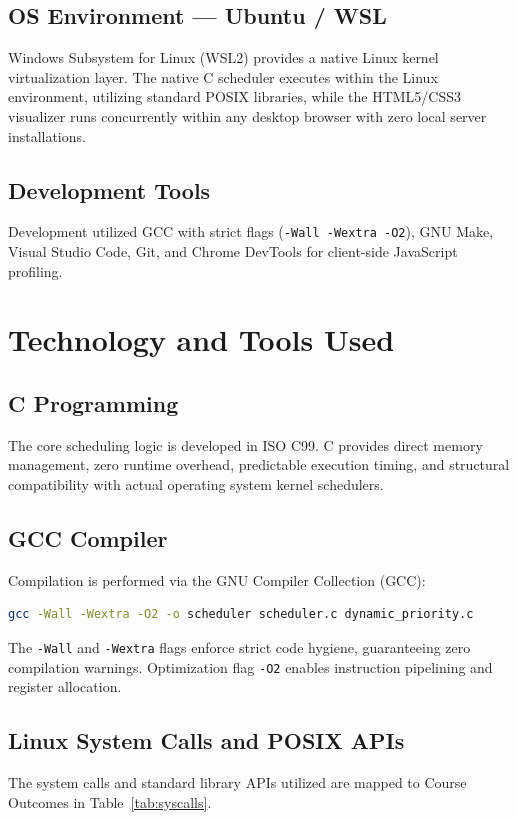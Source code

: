 \documentclass[12pt,a4paper]{report}
\begin{document}
\section{OS Environment --- Ubuntu / WSL}
Windows Subsystem for Linux (WSL2) provides a native Linux kernel virtualization layer. The native C scheduler executes within the Linux environment, utilizing standard POSIX libraries, while the HTML5/CSS3 visualizer runs concurrently within any desktop browser with zero local server installations.

\section{Development Tools}
Development utilized GCC with strict flags (\texttt{-Wall -Wextra -O2}), GNU Make, Visual Studio Code, Git, and Chrome DevTools for client-side JavaScript profiling.

\chapter{Technology and Tools Used}\label{ch4}

\section{C Programming}
The core scheduling logic is developed in ISO C99. C provides direct memory management, zero runtime overhead, predictable execution timing, and structural compatibility with actual operating system kernel schedulers.

\section{GCC Compiler}
Compilation is performed via the GNU Compiler Collection (GCC):
\begin{lstlisting}[language=bash]
gcc -Wall -Wextra -O2 -o scheduler scheduler.c dynamic_priority.c
\end{lstlisting}
The \texttt{-Wall} and \texttt{-Wextra} flags enforce strict code hygiene, guaranteeing zero compilation warnings. Optimization flag \texttt{-O2} enables instruction pipelining and register allocation.

\section{Linux System Calls and POSIX APIs}
The system calls and standard library APIs utilized are mapped to Course Outcomes in Table~\ref{tab:syscalls}.
\end{document}
